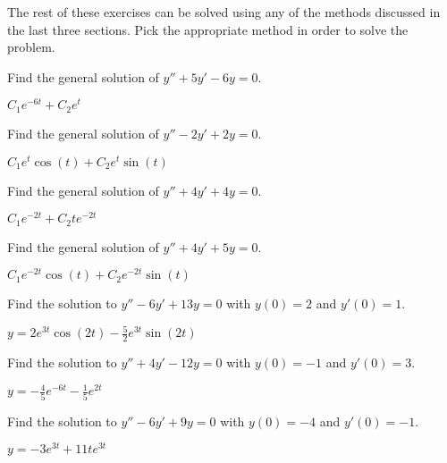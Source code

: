 \noindent The rest of these exercises can be solved using any of the methods discussed in the last three sections. Pick the appropriate method in order to solve the problem.

\begin{exercise}
Find the general solution of $y'' + 5y' - 6y = 0$.
\end{exercise}
\comboSol{%
}
{%
$C_1e^{-6t} + C_2e^t$
}

\begin{exercise}
Find the general solution of $y'' - 2y' + 2y = 0$.
\end{exercise}
\comboSol{%
}
{%
$C_1e^t\cos(t) + C_2e^t\sin(t)$
}

\begin{exercise}
Find the general solution of $y'' + 4y' + 4y = 0$.
\end{exercise}
\comboSol{%
}
{%
$C_1e^{-2t} + C_2te^{-2t}$
}

\begin{exercise}
Find the general solution of $y'' + 4y' + 5y = 0$.
\end{exercise}
\comboSol{%
}
{%
$C_1e^{-2t}\cos(t) + C_2e^{-2t}\sin(t)$
}

\begin{exercise}
Find the solution to $y'' - 6y' + 13y = 0$ with $y(0) = 2$ and $y'(0) = 1$. 
\end{exercise}
\comboSol{%
}
{%
$y = 2e^{3t}\cos(2t) - \frac{5}{2}e^{3t}\sin(2t)$
}

\begin{exercise}
Find the solution to $y'' + 4y' - 12y = 0$ with $y(0) = -1$ and $y'(0) = 3$. 
\end{exercise}
\comboSol{%
}
{%
$y= -\frac{4}{5}e^{-6t} - \frac{1}{5}e^{2t}$
}

\begin{exercise}
Find the solution to $y'' - 6y' + 9y = 0$ with $y(0) = -4$ and $y'(0) = -1$. 
\end{exercise}
\comboSol{%
}
{%
$y = -3e^{3t} + 11te^{3t}$
}



